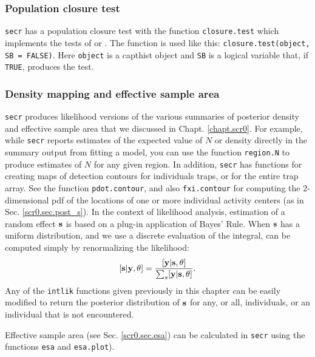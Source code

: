 \subsubsection{Population closure test}
\mbox{\tt secr} has a population closure test with the function
\mbox{\tt closure.test} which implements the tests of
\citet{stanley_burnham:1999} or \citet{otis_etal:1978}. The function
is used like this: \newline
\mbox{\tt closure.test(object, SB = FALSE)}.
Here \mbox{\tt object} is a 
capthist object and \mbox{\tt SB} is a logical variable that, if
\mbox{\tt TRUE},
produces the 
\citet{stanley_burnham:1999} test. 


\subsubsection{Density mapping and effective sample area}
\mbox{\tt secr} produces likelihood versions of the various summaries
of posterior density and effective sample area that we discussed in
Chapt. \ref{chapt.scr0}. For example, while
\mbox{\tt secr} reports estimates of the expected value of $N$ or density directly in the summary
output from fitting a model, you can use 
the function \mbox{\tt region.N} to produce estimates of $N$ for any
given region.  In addition,
\mbox{\tt secr} 
has functions  for creating maps of detection contours for individuals
traps, or for the entire trap array. See the 
function \mbox{\tt pdot.contour}, and also
 \mbox{\tt fxi.contour} for computing the 2-dimensional pdf of 
 the locations of one or more individual activity centers (as in
 Sec. \ref{scr0.sec.post_s}). In the context of likelihood analysis, estimation of a
 random effect ${\bf s}$ is based on a plug-in application of
 Bayes' Rule.
When ${\bf s}$ has a uniform distribution, and we use a
discrete evaluation of the integral, can be computed
simply by renormalizing the likelihood:
\[
 [{\bf s}| {\bf y},\theta] = \frac{ [{\bf y} | {\bf s},\theta]  }{ \sum_{s} [{\bf y} | {\bf s},\theta]  }.
\]
Any of the \mbox{\tt intlik} functions given previously in this
chapter can be easily modified to return the posterior distribution of
${\bf s}$ for 
any, or all, individuals, or an individual that is not encountered. 

Effective sample area
(see Sec. \ref{scr0.sec.esa}) 
 can be calculated in
\mbox{\tt secr} 
using the functions
\mbox{\tt esa} and \mbox{\tt esa.plot}). 

